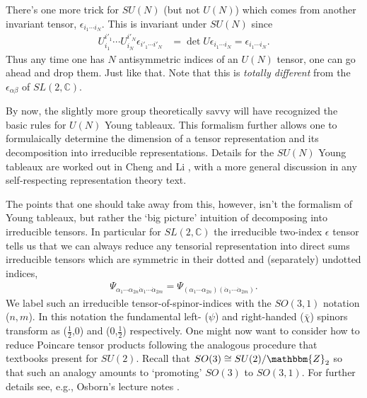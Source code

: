 \documentclass[12pt]{article}
\numberwithin{equation}{section}    %
\begin{document}
There's one more trick for $SU(N)$ (but not $U(N)$) which comes from another invariant tensor, $\epsilon_{i_1\cdots i_N}$. This is invariant under $SU(N)$ since
\begin{align}
	U_{i_1}^{i'_1}\cdots U_{i_N}^{i'_N} \epsilon_{i'_1\cdots i'_N} &= \det U \epsilon_{i_1\cdots i_N} = \epsilon_{i_1\cdots i_N}.
\end{align} 
Thus any time one has $N$ antisymmetric indices of an $U(N)$ tensor, one can go ahead and drop them. Just like that. 
Note that this is \textit{totally different} from the $\epsilon_{\alpha\beta}$ of $SL(2,\mathbb{C})$.

By now, the slightly more group theoretically savvy will have recognized the basic rules for $U(N)$ Young tableaux. This formalism further allows one to formulaically determine the dimension of a tensor representation and its decomposition into irreducible representations. Details for the $SU(N)$ Young tableaux are worked out in Cheng and Li \cite{chengandli}, with a more general discussion in any self-respecting representation theory text. 


The points that one should take away from this, however, isn't the formalism of Young tableaux, but rather the `big picture' intuition of decomposing into irreducible tensors. In particular for $SL(2,\mathbb{C})$ the irreducible two-index $\epsilon$ tensor tells us that we can always reduce any tensorial representation into direct sums irreducible tensors which are symmetric in their dotted and (separately) undotted indices,
\begin{align}
	\Psi_{\alpha_1\cdots\alpha_{2n} \dot\alpha_1\cdots\dot\alpha_{2m}} = 
	\Psi_{(\alpha_1\cdots\alpha_{2n}) (\dot\alpha_1\cdots\dot\alpha_{2m})}.
\end{align}
%
We label such an irreducible tensor-of-spinor-indices with the $SO(3,1)$ notation ($n,m$). In this notation the fundamental left- ($\psi$) and right-handed ($\bar\chi$) spinors transform as ($\frac 12$,0) and (0,$\frac 12$) respectively. One might now want to consider how to reduce Poincare tensor products following the analogous procedure that textbooks present for $SU(2)$. Recall that $SO(3)\cong SU(2)/\mathbbm{Z}_2$ so that such an analogy amounts to `promoting' $SO(3)$ to $SO(3,1)$. For further details see, e.g., Osborn's lecture notes \cite{Osborn:Symmetries}.


\end{document}
